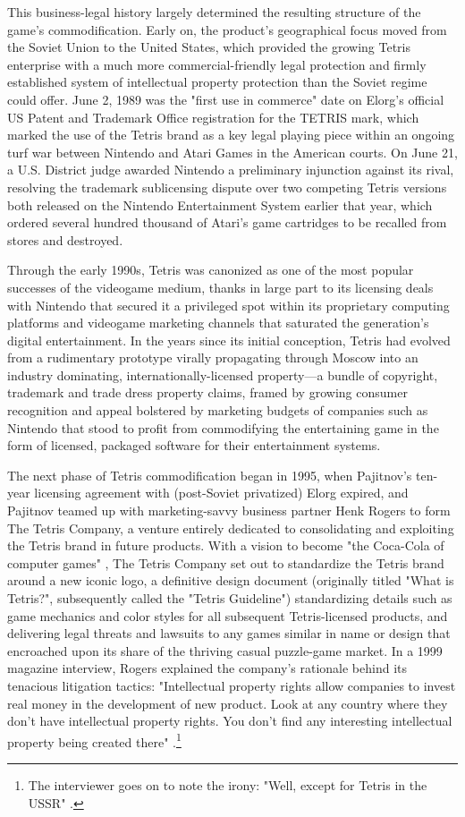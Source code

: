 This business-legal history largely determined the resulting structure of the game's commodification. Early on, the product's geographical focus moved from the Soviet Union to the United States, which provided the growing Tetris enterprise with a much more commercial-friendly legal protection and firmly established system of intellectual property protection than the Soviet regime could offer. June 2, 1989 was the "first use in commerce" date on Elorg's official US Patent and Trademark Office registration for the \textsc{TETRIS} mark, which marked the use of the Tetris brand as a key legal playing piece within an ongoing turf war between Nintendo and Atari Games in the American courts. On June 21, a U.S. District judge awarded Nintendo a preliminary injunction against its rival, resolving the trademark sublicensing dispute over two competing Tetris versions both released on the Nintendo Entertainment System earlier that year, which ordered several hundred thousand of Atari's game cartridges to be recalled from stores and destroyed.

Through the early 1990s, Tetris was canonized as one of the most popular successes of the videogame medium, thanks in large part to its licensing deals with Nintendo that secured it a privileged spot within its proprietary computing platforms and videogame marketing channels that saturated the generation's digital entertainment. In the years since its initial conception, Tetris had evolved from a rudimentary prototype virally propagating through Moscow into an industry dominating, internationally-licensed property---a bundle of copyright, trademark and trade dress property claims, framed by growing consumer recognition and appeal bolstered by marketing budgets of companies such as Nintendo that stood to profit from commodifying the entertaining game in the form of licensed, packaged software for their entertainment systems.

The next phase of Tetris commodification began in 1995, when Pajitnov's ten-year licensing agreement with (post-Soviet privatized) Elorg expired, and Pajitnov teamed up with marketing-savvy business partner Henk Rogers to form The Tetris Company, a venture entirely dedicated to consolidating and exploiting the Tetris brand in future products. With a vision to become "the Coca-Cola of computer games" \autocite{Edge1999}, The Tetris Company set out to standardize the Tetris brand around a new iconic logo, a definitive design document (originally titled "What is Tetris?", subsequently called the "Tetris Guideline") standardizing details such as game mechanics and color styles for all subsequent Tetris-licensed products, and delivering legal threats and lawsuits to any games similar in name or design that encroached upon its share of the thriving casual puzzle-game market. In a 1999 magazine interview, Rogers explained the company's rationale behind its tenacious litigation tactics: "Intellectual property rights allow companies to invest real money in the development of new product. Look at any country where they don't have intellectual property rights. You don't find any interesting intellectual property being created there" \autocite{Edge1999}.\footnote{
  The interviewer goes on to note the irony: "Well, except for Tetris in the USSR" \autocite{Edge1999}.
}


